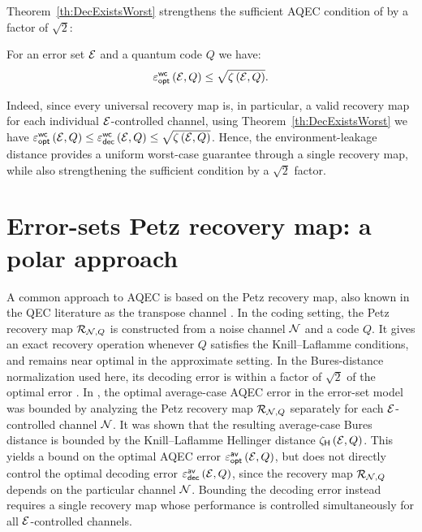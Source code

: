 \documentclass[10pt]{article}
\newcommand{\p}[1]{\left(#1\right)}
\newcommand{\s}[1]{\mathsf{#1}}
\begin{document}
Theorem~\ref{th:DecExistsWorst} strengthens the sufficient AQEC condition of \cite[Theorem~3]{Elimelech2026Theory} by a factor of $\sqrt{2}$:
\begin{cor}\label{cor:ZetaBetterBound} For an error set ${\cal E} $ and a quantum code $Q$ we have:
    \[ \varepsilon_{\s{opt}}^{\s{wc}}\p{\calE,Q}  \leq \sqrt{\zeta\p{\calE,Q}}. \]
\end{cor} Indeed, since every universal recovery map is, in particular, a valid recovery map for each individual ${\cal E}$-controlled channel, using Theorem~\ref{th:DecExistsWorst} we have $\varepsilon_{\s{opt}}^{\s{wc}}\p{\calE,Q} \leq \varepsilon_{\s{dec}}^{\s{wc}}\p{\calE,Q} \leq \sqrt{\zeta\p{\calE,Q}}$. Hence, the environment-leakage distance provides a uniform worst-case guarantee through a single recovery map, while also strengthening  
the sufficient condition by a $\sqrt{2}$ factor. 


\section{Error-sets Petz recovery map: a polar approach}
A common approach to AQEC is based on the Petz recovery map, also known in the QEC literature as the transpose channel \cite{barnum2002reversing,ng2010simple,noh2018quantum,zheng2024near,li2025optimality,kim2026optimal}. In the coding setting, the Petz recovery map ${\cal R}_{{\cal N},Q}$ is constructed from a noise channel ${\cal N}$ and a code $Q$. It gives an exact recovery operation whenever $Q$ satisfies the Knill--Laflamme conditions, and remains near optimal in the approximate setting. In the Bures-distance normalization used here, its decoding error is within a factor of $\sqrt{2}$ of the optimal error \cite{barnum2002reversing,ng2010simple}. In \cite{Elimelech2026Theory}, the optimal average-case AQEC error in the error-set model was bounded by analyzing the Petz recovery map ${\cal R}_{{\cal N},Q}$ separately for each ${\cal E}$-controlled channel ${\cal N}$. It was shown that the resulting average-case Bures distance is bounded by the Knill--Laflamme Hellinger distance $\zeta_{\s{H}}\p{\calE,Q}$. This yields a bound on the optimal AQEC error $\varepsilon_{\s{opt}}^{\s{av}}\p{\calE,Q}$, but does not directly control the optimal decoding error $\varepsilon_{\s{dec}}^{\s{av}}\p{\calE,Q}$, since the recovery map ${\cal R}_{{\cal N},Q}$ depends on the particular channel ${\cal N}$. Bounding the decoding error instead requires a single recovery map whose performance is controlled simultaneously for all ${\cal E}$-controlled channels.
\end{document}
